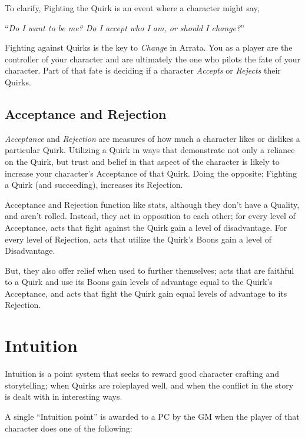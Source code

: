 \documentclass[../main.tex]{subfiles}
\begin{document}
        To clarify, Fighting the Quirk is an event where a character might say,
        
        \begin{center}
            ``\emph{Do I want to be me? Do I accept who I am, or should I change?}''
        \end{center}
    
        Fighting against Quirks is the key to \emph{Change} in Arrata. You as a player are the controller of your character and are ultimately the one who pilots the fate of your character. Part of that fate is deciding if a character \emph{Accepts} or \emph{Rejects} their Quirks.

    \subsection{Acceptance and Rejection}

        \emph{Acceptance} and \emph{Rejection} are measures of how much a character likes or dislikes a particular Quirk. Utilizing a Quirk in ways that demonstrate not only a reliance on the Quirk, but trust and belief in that aspect of the character is likely to increase your character's Acceptance of that Quirk. Doing the opposite; Fighting a Quirk (and succeeding), increases its Rejection.
    
        Acceptance and Rejection function like stats, although they don't have a Quality, and aren't rolled. Instead, they act in opposition to each other; for every level of Acceptance, acts that fight against the Quirk gain a level of disadvantage. For every level of Rejection, acts that utilize the Quirk's Boons gain a level of Disadvantage.

        But, they also offer relief when used to further themselves; acts that are faithful to a Quirk and use its Boons gain levels of advantage equal to the Quirk's Acceptance, and acts that fight the Quirk gain equal levels of advantage to its Rejection.


    \section{Intuition}\label{intuition}

        Intuition is a point system that seeks to reward good character crafting and storytelling; when Quirks are roleplayed well, and when the conflict in the story is dealt with in interesting ways.

        A single ``Intuition point'' is awarded to a PC by the GM when the player of that character does one of the following:
\end{document}
